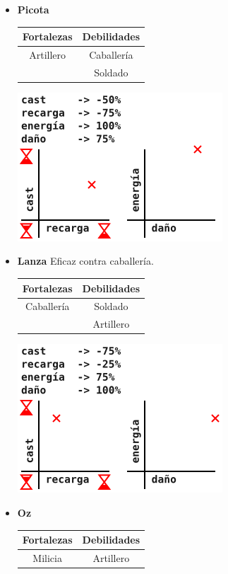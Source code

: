 \begin{itemize}
\item \textbf{Picota}
  
  \begin{center}
    \begin{tabular}{c|c}
      \textbf{Fortalezas} & \textbf{Debilidades} \\
      \hline
      Artillero & Caballería \\
      & Soldado
    \end{tabular}
  \end{center}

  \begin{center}
    \includegraphics[width=.35\textwidth]{assets/lvl-design/picota.png}
  \end{center}

\item \textbf{Lanza} Eficaz contra caballería.

  \begin{center}
    \begin{tabular}{c|c}
      \textbf{Fortalezas} & \textbf{Debilidades} \\
      \hline
      Caballería & Soldado \\
      & Artillero
    \end{tabular}
  \end{center}

  \begin{center}
    \includegraphics[width=.35\textwidth]{assets/lvl-design/lanza.png}
  \end{center}

\item \textbf{Oz}

  \begin{center}
    \begin{tabular}{c|c}
      \textbf{Fortalezas} & \textbf{Debilidades} \\
      \hline
      Milicia & Artillero
    \end{tabular}
  \end{center}


\end{itemize}
